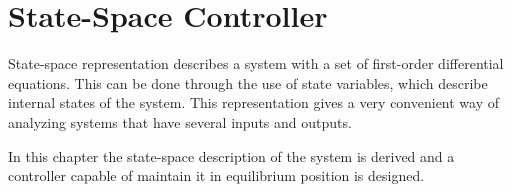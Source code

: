\chapter{State-Space Controller}\label{chap:stateSpaceController}
State-space representation describes a system with a set of first-order differential equations. This can be done through the use of state variables, which describe internal states of the system. This representation gives a very convenient way of analyzing systems that have several inputs and outputs.

In this chapter the state-space description of the system is derived and a controller capable of maintain it in equilibrium position is designed.

